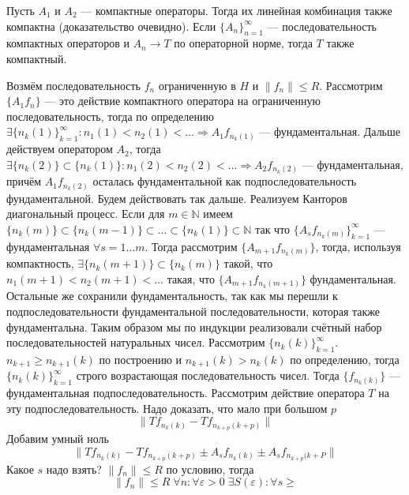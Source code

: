 \documentclass[14pt]{extarticle}
\begin{document}
\begin{Utv}
    Пусть $A_1$ и $A_2$ --- компактные операторы.
    Тогда их линейная комбинация также компактна (доказательство очевидно).
    Если $\{A_n\}_{n = 1}^\infty$ --- последовательность компактных операторов 
    и $A_n \to T$ по операторной норме, тогда
    $T$ также компактный.
\end{Utv}
\begin{Proof}
    Возмём последовательность $f_n$ ограниченную в $H$ и $\|f_n\| \le R$.
    Рассмотрим $\{A_1 f_n\}$ --- это действие компактного оператора на 
    ограниченную последовательность, тогда по
    определению $\exists \{n_k(1)\}_{k = 1}^\infty \colon n_1(1) < n_2(1) < 
    \dots \Rightarrow A_1 f_{n_k(1)}$ ---
    фундаментальная.
    Дальше действуем оператором $A_2$, тогда $\exists \{n_k(2)\} \subset 
    \{n_k(1)\} \colon n_1(2) < n_2(2) < \dots 
    \Rightarrow A_2 f_{n_k(2)}$ --- фундаментальная, причём $A_1 f_{n_k(2)}$ 
    осталась фундаментальной как
    подпоследовательность фундаментальной.
    Будем действовать так дальше.
    Реализуем Канторов диагональный процесс.
    Если для $m \in \mathbb N$ имеем $\{n_k(m)\} \subset \{n_k(m - 1)\} 
    \subset \dots \subset \{n_k(1)\} \subset \mathbb N$
    так что $\{A_s f_{n_k(m)}\}_{k = 1}^{\infty}$ --- фундаментальная $\forall 
    s = 1 \dots m$.
    Тогда рассмотрим $\{A_{m + 1} f_{n_k(m)}\}$, тогда, используя 
    компактность, $\exists \{n_k(m + 1)\} \subset \{n_k(m)\}$
    такой, что $n_1(m + 1) < n_2(m + 1) < \dots$ такая, что $\{A_{m + 1} 
    f_{n_k(m + 1)}\}$ фундаментальная.
    Остальные же сохранили фундаментальность, так как мы перешли к 
    подпоследовательности фундаментальной 
    последовательности, которая также фундаментальна.
    Таким образом мы по индукции реализовали счётный набор последовательностей 
    натуральных чисел.
    Рассмотрим $\{n_k(k)\}_{k = 1}^\infty$.
    $n_{k + 1} \ge n_{k + 1}(k)$ по построению и $n_{k + 1}(k) > n_k(k)$ по 
    определению, тогда $\{n_k(k)\}_{k = 1}^\infty$
    строго возрастающая последовательность чисел.
    Тогда $\{f_{n_k(k)}\}$ --- фундаментальная подпоследовательность.
    Рассмотрим действие оператора $T$ на эту подпоследовательность.
    Надо доказать, что мало при большом $p$
    $$
    \|T f_{n_k(k)} - T f_{n_{k + p}(k + p)}\|
    $$
    Добавим умный ноль
    $$
    \|T f_{n_k(k)} -T f_{n_{k + p}(k + p)} \pm A_s f_{n_k(k)} \pm 
    A_s f_{n_{k + p}(k + P}\|
    $$
    Какое $s$ надо взять?
    $\|f_n\| \le R$ по условию, тогда 
    $$
    \|f_n\| \le R\; \forall n \colon \forall
    \varepsilon > 0\; \exists S(\varepsilon)\colon \forall s \ge 
$$
\end{Proof}
\end{document}
